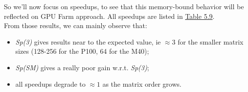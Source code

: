 So we'll now focus on speedups, to see that this memory-bound behavior will be reflected on GPU Farm approach. All speedups are listed in \hyperref[tab:matspeedup]{Table 5.9}.\\
From those results, we can mainly observe that:
\begin{itemize}
	\item \textit{Sp(3)} gives results near to the expected value, ie \(\approx 3\) for the smaller matrix sizes (128-256 for the P100, 64 for the M40);
	
	\item 	\textit{Sp(SM)} gives a really poor gain w.r.t. \textit{Sp(3)};
	
	\item all speedups degrade  to \(\approx1\) as the matrix order grows.
\end{itemize}

